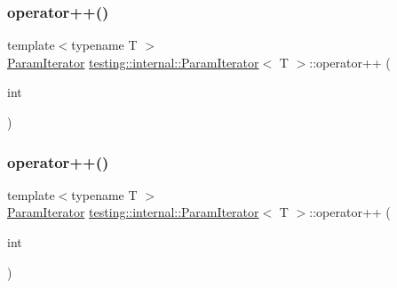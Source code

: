 \subsubsection{\texorpdfstring{operator++()}{operator++()}\hspace{0.1cm}{\footnotesize\ttfamily [4/6]}}
{\footnotesize\ttfamily template$<$typename T $>$ \\
\mbox{\hyperlink{classtesting_1_1internal_1_1_param_iterator}{Param\+Iterator}} \mbox{\hyperlink{classtesting_1_1internal_1_1_param_iterator}{testing\+::internal\+::\+Param\+Iterator}}$<$ T $>$\+::operator++ (\begin{DoxyParamCaption}\item[{int}]{ }\end{DoxyParamCaption})\hspace{0.3cm}{\ttfamily [inline]}}

\mbox{\label{classtesting_1_1internal_1_1_param_iterator_af51e17827dd54977165937550c0fb030}} 
\subsubsection{\texorpdfstring{operator++()}{operator++()}\hspace{0.1cm}{\footnotesize\ttfamily [5/6]}}
{\footnotesize\ttfamily template$<$typename T $>$ \\
\mbox{\hyperlink{classtesting_1_1internal_1_1_param_iterator}{Param\+Iterator}} \mbox{\hyperlink{classtesting_1_1internal_1_1_param_iterator}{testing\+::internal\+::\+Param\+Iterator}}$<$ T $>$\+::operator++ (\begin{DoxyParamCaption}\item[{int}]{ }\end{DoxyParamCaption})\hspace{0.3cm}{\ttfamily [inline]}}

\mbox{\label{classtesting_1_1internal_1_1_param_iterator_af51e17827dd54977165937550c0fb030}} 
